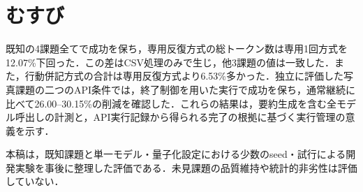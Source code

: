 \documentclass[letter]{ieicej}
\begin{document}
\section{むすび}

既知の4課題全てで成功を保ち，専用反復方式の総トークン数は専用1回方式を12.07\%下回った．この差はCSV処理のみで生じ，他3課題の値は一致した．また，行動併記方式の合計は専用反復方式より6.53\%多かった．独立に評価した写真課題の二つのAPI条件では，終了制御を用いた実行で成功を保ち，通常継続に比べて26.00--30.15\%の削減を確認した．これらの結果は，要約生成を含む全モデル呼出しの計測と，API実行記録から得られる完了の根拠に基づく実行管理の意義を示す．

本稿は，既知課題と単一モデル・量子化設定における少数のseed・試行による開発実験を事後に整理した評価である．未見課題の品質維持や統計的非劣性は評価していない．


\end{document}
